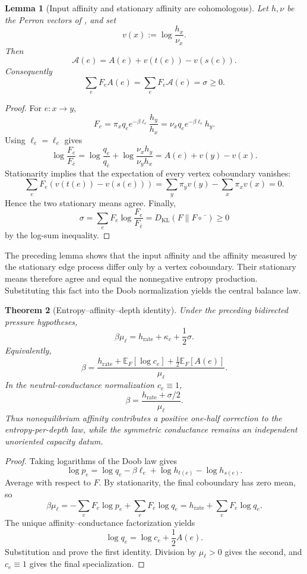 \documentclass[11pt]{article}
\newtheorem{theorem}{Theorem}[section]
\newtheorem{lemma}[theorem]{Lemma}
\theoremstyle{definition}
\theoremstyle{remark}
\begin{document}
\begin{lemma}[Input affinity and stationary affinity are cohomologous]
\label{lem:stationary-affinity-cohomology}
Let $h,\nu$ be the Perron vectors of
, and set
\[
 v(x):=\log\frac{h_x}{\nu_x}.
\]
Then
\[
 \mathscr A(e)=A(e)+v(t(e))-v(s(e)).
\]
Consequently
\[
 \boxed{
 \sum_eF_eA(e)=\sum_eF_e\mathscr A(e)=\sigma\ge0.}
\]
\end{lemma}

\begin{proof}
For $e:x\to y$,
\[
 F_e
 =\pi_xq_e e^{-\beta\ell_e}\frac{h_y}{h_x}
 =\nu_xq_e e^{-\beta\ell_e}h_y.
\]
Using $\ell_{\bar e}=\ell_e$ gives
\[
 \log\frac{F_e}{F_{\bar e}}
 =\log\frac{q_e}{q_{\bar e}}
  +\log\frac{\nu_xh_y}{\nu_yh_x}
 =A(e)+v(y)-v(x).
\]
Stationarity implies that the expectation of every vertex coboundary vanishes:
\[
 \sum_eF_e(v(t(e))-v(s(e)))
 =\sum_y\pi_yv(y)-\sum_x\pi_xv(x)=0.
\]
Hence the two stationary means agree.  Finally,
\[
 \sigma
 =\sum_eF_e\log\frac{F_e}{F_{\bar e}}
 =D_{\mathrm{KL}}(F\|F\circ\bar{\phantom e})\ge0
\]
by the log-sum inequality.
\end{proof}

The preceding lemma shows that the input affinity and the affinity measured by
the stationary edge process differ only by a vertex coboundary.  Their stationary
means therefore agree and equal the nonnegative entropy production.  Substituting
this fact into the Doob normalization yields the central balance law.

\begin{theorem}[Entropy--affinity--depth identity]
\label{thm:entropy-affinity-depth}
Under the preceding bidirected pressure hypotheses,
\[
 \boxed{
 \beta\mu_\ell
 =h_{\mathrm{rate}}+\kappa_c+\frac12\sigma.}
\]
Equivalently,
\[
 \boxed{
 \beta
 =
 \frac{
 h_{\mathrm{rate}}
 +\mathbb E_F[\log c_e]
 +\tfrac12\mathbb E_F[A(e)]}
 {\mu_\ell}.}
\]
In the neutral-conductance normalization $c_e\equiv1$,
\[
 \boxed{
 \beta=\frac{h_{\mathrm{rate}}+\sigma/2}{\mu_\ell}.}
\]
Thus nonequilibrium affinity contributes a positive one-half correction to the
entropy-per-depth law, while the symmetric conductance remains an independent
unoriented capacity datum.
\end{theorem}

\begin{proof}
Taking logarithms of the Doob law gives
\[
 \log p_e
 =\log q_e-\beta\ell_e
  +\log h_{t(e)}-\log h_{s(e)}.
\]
Average with respect to $F$.  By stationarity, the final coboundary has zero
mean, so
\[
 \beta\mu_\ell
 =-\sum_eF_e\log p_e+\sum_eF_e\log q_e
 =h_{\mathrm{rate}}+\sum_eF_e\log q_e.
\]
The unique affinity--conductance factorization yields
\[
 \log q_e=\log c_e+\frac12A(e).
\]
Substitution and  prove the first
identity.  Division by $\mu_\ell>0$ gives the second, and $c_e\equiv1$ gives
the final specialization.
\end{proof}
\end{document}
